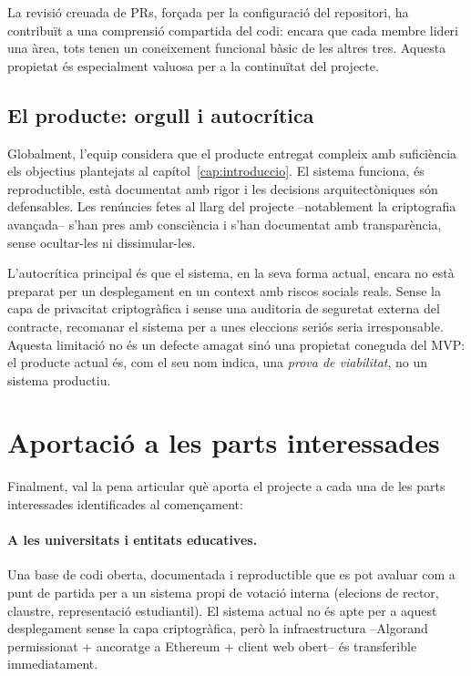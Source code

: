 La revisió creuada de \acsp{PR}, forçada per la configuració del
repositori, ha contribuït a una comprensió compartida del codi:
encara que cada membre lideri una àrea, tots tenen un coneixement
funcional bàsic de les altres tres. Aquesta propietat és
especialment valuosa per a la continuïtat del projecte.

\subsection{El producte: orgull i autocrítica}

Globalment, l'equip considera que el producte entregat compleix
amb suficiència els objectius plantejats al
capítol~\ref{cap:introduccio}. El sistema funciona, és reproductible,
està documentat amb rigor i les decisions arquitectòniques són
defensables. Les renúncies fetes al llarg del projecte --notablement
la criptografia avançada-- s'han pres amb consciència i s'han
documentat amb transparència, sense ocultar-les ni dissimular-les.

L'autocrítica principal és que el sistema, en la seva forma actual,
encara no està preparat per un desplegament en un context amb riscos
socials reals. Sense la capa de privacitat criptogràfica i sense una
auditoria de seguretat externa del contracte, recomanar el sistema
per a unes eleccions seriós seria irresponsable. Aquesta limitació
no és un defecte amagat sinó una propietat coneguda del \ac{MVP}: el
producte actual és, com el seu nom indica, una \emph{prova de
viabilitat}, no un sistema productiu.

\section{Aportació a les parts interessades}
\label{sec:aportacio-stakeholders}

Finalment, val la pena articular què aporta el projecte a cada una de
les parts interessades identificades al començament:

\paragraph{A les universitats i entitats educatives.} Una base de
codi oberta, documentada i reproductible que es pot avaluar com a
punt de partida per a un sistema propi de votació interna
(elecions de rector, claustre, representació estudiantil). El
sistema actual no és apte per a aquest desplegament sense la capa
criptogràfica, però la infraestructura --Algorand permissionat +
ancoratge a Ethereum + client web obert-- és transferible
immediatament.

